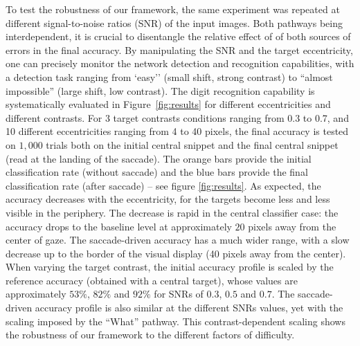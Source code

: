 To test the robustness of our framework, the same experiment was repeated at different signal-to-noise ratios (SNR) of the input images. Both pathways being interdependent, it is crucial to disentangle the relative effect of of both sources of errors in the final accuracy. By manipulating the SNR and the target eccentricity, one can precisely monitor the network detection and recognition capabilities, with a detection task ranging from `easy'' (small shift, strong contrast) to ``almost impossible'' (large shift, low contrast). The  digit recognition capability is systematically evaluated in Figure~\ref{fig:results} for different eccentricities and different contrasts. 
For 3 target contrasts conditions ranging from 0.3 to 0.7, and 10 different eccentricities ranging from 4 to 40 pixels, the final accuracy is tested on $1,000$ trials both on the initial central snippet and the final central snippet (read at the landing of the saccade). 
The orange bars provide the initial classification rate (without saccade) and the blue bars provide the final classification rate (after saccade) -- see figure \ref{fig:results}.  As expected, the accuracy decreases with the eccentricity, for the targets become less and less visible in the periphery. The decrease is rapid in the central classifier case: the accuracy drops to the baseline level
at approximately $20$ pixels away from the center of gaze. The saccade-driven accuracy has a much wider range, with a slow decrease up to the border of the visual display (40 pixels away from the center). 
When varying the target contrast, the initial accuracy profile is scaled by the reference accuracy (obtained with a central target), whose values are approximately $53\%$, $82\%$ and $92\%$ for SNRs of $0.3$, $0.5$ and $0.7$. The saccade-driven accuracy profile is also similar at the different SNRs values, yet with the scaling imposed by the ``What'' pathway. This contrast-dependent scaling shows the robustness of our framework to the different factors of difficulty.

